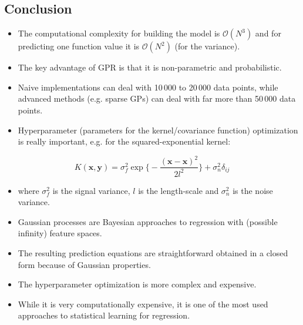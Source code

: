 \documentclass[a4paper, 11pt, accentcolor = tud3b]{tudreport}
\renewcommand{\vec}[1]{\mathbf{#1}}
\begin{document}
			\subsection{Conclusion}
			    \begin{itemize}
			    	\item The computational complexity for building the model is \( \mathcal{O}(N^3) \) and for predicting one function value it is \(\mathcal{O}(N^2)\) (for the variance).
			    	\item The key advantage of GPR is that it is non-parametric and probabilistic.
			    	\item Naive implementations can deal with 10\,000 to 20\,000 data points, while advanced methods (e.g. sparse GPs) can deal with far more than 50\,000 data points.
			    	\item Hyperparameter (parameters for the kernel/covariance function) optimization is really important, e.g. for the squared-exponential kernel:
			    \end{itemize}
			    \begin{equation}
				    K(\vec{x}, \vec{y}) = \sigma_f^2 \exp \Bigg\{ -\frac{(\vec{x} - \vec{x})^2}{2l^2} \Bigg\} + \sigma_n^2 \delta_{ij}
			    \end{equation}
				\begin{itemize}
					\item[] where \( \sigma_f^2 \) is the signal variance, \(l\) is the length-scale and \(\sigma_n^2\) is the noise variance.
					\item Gaussian processes are Bayesian approaches to regression with (possible infinity) feature spaces.
					\item The resulting prediction equations are straightforward obtained in a closed form because of Gaussian properties.
					\item The hyperparameter optimization is more complex and expensive.
					\item While it is very computationally expensive, it is one of the most used approaches to statistical learning for regression.
				\end{itemize}
		
\end{document}
